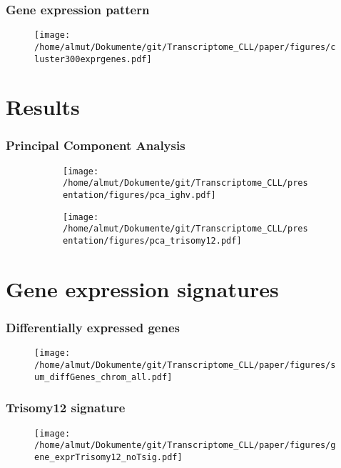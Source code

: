 \documentclass[xcolor=dvipsnames,t,10pt]{beamer}
\begin{document}
%
%
%
\begin{frame}[c]
	\frametitle{Gene expression pattern}
	\begin{figure}
		\centering
		\texttt{[image: /home/almut/Dokumente/git/Transcriptome\_CLL/paper/figures/cluster300exprgenes.pdf]}
	\end{figure}
\end{frame}
%
%
%
\section{Results}
%
%
%
%
\begin{frame}[c]
	\frametitle{Principal Component Analysis}
	\begin{figure}
		\centering
		\begin{subfigure}[t]{0.45\columnwidth}
		\texttt{[image: /home/almut/Dokumente/git/Transcriptome\_CLL/presentation/figures/pca\_ighv.pdf]}
		\end{subfigure}
		\hfill
		\begin{subfigure}[t]{0.45\columnwidth}
		\texttt{[image: /home/almut/Dokumente/git/Transcriptome\_CLL/presentation/figures/pca\_trisomy12.pdf]}
		\end{subfigure}
	\end{figure}
\end{frame}
% 
%
\section{Gene expression signatures}
%
%
\begin{frame}[c]
	\frametitle{Differentially expressed genes}
	\begin{figure}
		\centering
		\texttt{[image: /home/almut/Dokumente/git/Transcriptome\_CLL/paper/figures/sum\_diffGenes\_chrom\_all.pdf]}
	\end{figure}
\end{frame}
%
%
\begin{frame}[c]
	\frametitle{Trisomy12 signature}
	\begin{figure}
		\centering
		\texttt{[image: /home/almut/Dokumente/git/Transcriptome\_CLL/paper/figures/gene\_exprTrisomy12\_noTsig.pdf]}
	\end{figure}
\end{frame}
%
\end{document}
